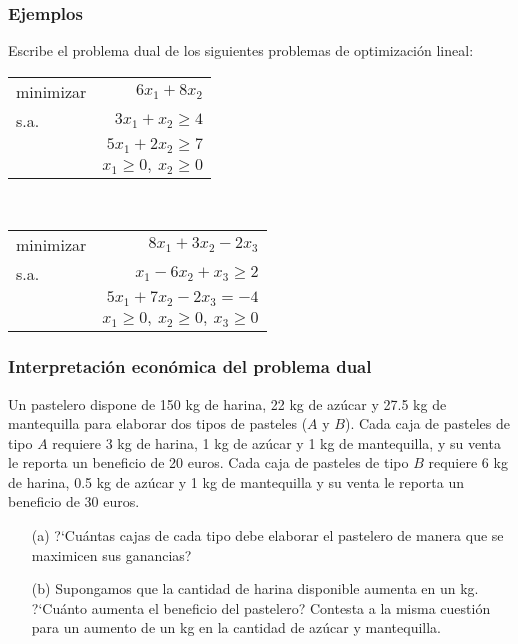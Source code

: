 \documentclass{beamer}
\begin{document}
\begin{frame}
\frametitle{Ejemplos}

Escribe el problema dual de los siguientes problemas de optimización lineal:

\begin{center}
\begin{tabular}{lr}
minimizar & $6x_1 + 8x_2$ \\
s.a. & $3x_1+x_2 \geq 4$    \\
	 & $5x_1 + 2x_2\geq 7$  \\
	 & $x_1\geq 0,\ x_2\geq 0$
\end{tabular}
\end{center}

\

\begin{center}
\begin{tabular}{lr}
minimizar & $8x_1 + 3x_2 - 2x_3$ \\
s.a. & $x_1-6x_2+x_3 \geq 2$    \\
	 & $5x_1 + 7x_2 - 2x_3= -4$  \\
	 & $x_1\geq 0,\ x_2\geq 0,\ x_3\geq 0$
\end{tabular}
\end{center}


\end{frame}
\begin{frame}
\frametitle{Interpretación económica del problema dual}

 Un pastelero dispone de 150 kg de harina, 22 kg de azúcar y 27.5
 kg de mantequilla para elaborar dos tipos de pasteles ($A$ y
 $B$). Cada caja de pasteles de tipo $A$ requiere 3 kg de harina,
 1 kg de azúcar y 1 kg de mantequilla, y su venta le reporta un
 beneficio de 20 euros. Cada caja de pasteles
  de tipo $B$ requiere 6 kg de harina,
 0.5 kg de azúcar y 1 kg de mantequilla y su venta le reporta un
 beneficio de 30 euros.
 \begin{itemize}
 \item[(a)] ?`Cu\'antas cajas de cada
 tipo debe elaborar el pastelero de manera que se maximicen sus
 ganancias? 
 \item [(b)] Supongamos que la
 cantidad de harina disponible aumenta en un kg. ?`Cu\'anto aumenta
 el beneficio del pastelero? Contesta a la misma cuesti\'on para un
 aumento de un kg en la cantidad de az\'ucar y mantequilla.
 \end{itemize}


\end{frame}
\end{document}
